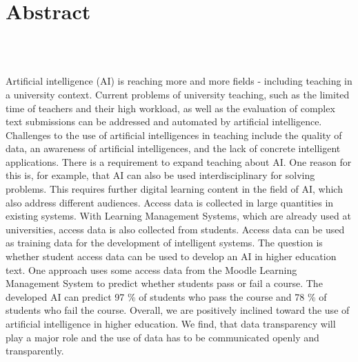 \chapter*{Abstract}
\begin{center}
  \DocumentThesisTitle
  \\
  \vspace{.3cm}
  \DocumentAuthorPrename\ \DocumentAuthorName
\end{center}
Artificial intelligence (AI) is reaching more and more fields - including teaching in a university context. Current problems of university teaching, such as the limited time of teachers and their high workload, as well as the evaluation of complex text submissions can be addressed and automated by artificial intelligence. Challenges to the use of artificial intelligences in teaching include the quality of data, an awareness of artificial intelligences, and the lack of concrete intelligent applications. There is a requirement to expand teaching about AI. One reason for this is, for example, that AI can also be used interdisciplinary for solving problems. This requires further digital learning content in the field of AI, which also address different audiences. Access data is collected in large quantities in existing systems. With Learning Management Systems, which are already used at universities, access data is also collected from students. Access data can be used as training data for the development of intelligent systems. The question is whether student access data can be used to develop an AI in higher education text. One approach uses some access data from the Moodle Learning Management System to predict whether students pass or fail a course. The developed AI can predict 97 \% of students who pass the course and 78 \% of students who fail the course. Overall, we are positively inclined toward the use of artificial intelligence in higher education. We find, that data transparency will play a major role and the use of data has to be communicated openly and transparently.

